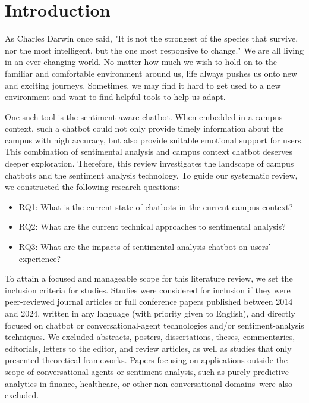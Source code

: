 \documentclass{xum_review}
\begin{document}
\tableofcontents
\newpage
\setcounter{page}{1}

\section{Introduction}
As Charles Darwin once said, "It is not the strongest of the species that
survive, nor the most intelligent, but the one most responsive to change." We
are all living in an ever-changing world. No matter how much we wish to hold on
to the familiar and comfortable environment around us, life always pushes us
onto new and exciting journeys. Sometimes, we may find it hard to get used to a
new environment and want to find helpful tools to help us adapt. 

One such tool is the sentiment-aware chatbot. When embedded in a campus context,
such a chatbot could not only provide timely information about the campus with
high accuracy, but also provide suitable emotional support for users. This
combination of sentimental analysis and campus context chatbot deserves deeper
exploration. Therefore, this review investigates the landscape of campus
chatbots and the sentiment analysis technology. To guide our systematic review,
we constructed the following research questions:
\begin{itemize}
    \item RQ1: What is the current state of chatbots in the current campus
    context?
    \item RQ2: What are the current technical approaches to sentimental
    analysis?
    \item RQ3: What are the impacts of sentimental analysis chatbot on users'
    experience?
\end{itemize}

To attain a focused and manageable scope for this literature review, we set the
inclusion criteria for studies. Studies were considered for inclusion if they
were peer-reviewed journal articles or full conference papers published between
2014 and 2024, written in any language (with priority given to English), and
directly focused on chatbot or conversational-agent technologies and/or
sentiment-analysis techniques. We excluded abstracts, posters, dissertations,
theses, commentaries, editorials, letters to the editor, and review articles, as
well as studies that only presented theoretical frameworks. Papers focusing on
applications outside the scope of conversational agents or sentiment
analysis, such as purely predictive analytics in finance, healthcare, or other
non-conversational domains--were also excluded.
\end{document}
